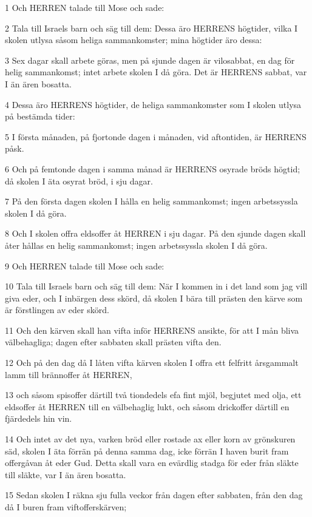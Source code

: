 \par 1 Och HERREN talade till Mose och sade:
\par 2 Tala till Israels barn och säg till dem: Dessa äro HERRENS högtider, vilka I skolen utlysa såsom heliga sammankomster; mina högtider äro dessa:
\par 3 Sex dagar skall arbete göras, men på sjunde dagen är vilosabbat, en dag för helig sammankomst; intet arbete skolen I då göra. Det är HERRENS sabbat, var I än ären bosatta.
\par 4 Dessa äro HERRENS högtider, de heliga sammankomster som I skolen utlysa på bestämda tider:
\par 5 I första månaden, på fjortonde dagen i månaden, vid aftontiden, är HERRENS påsk.
\par 6 Och på femtonde dagen i samma månad är HERRENS osyrade bröds högtid; då skolen I äta osyrat bröd, i sju dagar.
\par 7 På den första dagen skolen I hålla en helig sammankomst; ingen arbetssyssla skolen I då göra.
\par 8 Och I skolen offra eldsoffer åt HERREN i sju dagar. På den sjunde dagen skall åter hållas en helig sammankomst; ingen arbetssyssla skolen I då göra.
\par 9 Och HERREN talade till Mose och sade:
\par 10 Tala till Israels barn och säg till dem: När I kommen in i det land som jag vill giva eder, och I inbärgen dess skörd, då skolen I bära till prästen den kärve som är förstlingen av eder skörd.
\par 11 Och den kärven skall han vifta inför HERRENS ansikte, för att I mån bliva välbehagliga; dagen efter sabbaten skall prästen vifta den.
\par 12 Och på den dag då I låten vifta kärven skolen I offra ett felfritt årsgammalt lamm till brännoffer åt HERREN,
\par 13 och såsom spisoffer därtill två tiondedels efa fint mjöl, begjutet med olja, ett eldsoffer åt HERREN till en välbehaglig lukt, och såsom drickoffer därtill en fjärdedels hin vin.
\par 14 Och intet av det nya, varken bröd eller rostade ax eller korn av grönskuren säd, skolen I äta förrän på denna samma dag, icke förrän I haven burit fram offergåvan åt eder Gud. Detta skall vara en evärdlig stadga för eder från släkte till släkte, var I än ären bosatta.
\par 15 Sedan skolen I räkna sju fulla veckor från dagen efter sabbaten, från den dag då I buren fram viftofferskärven;
